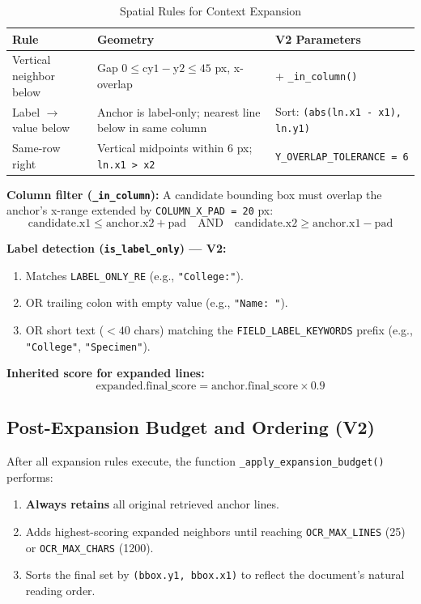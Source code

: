 \documentclass[11pt,a4paper]{article}
\begin{document}
\begin{table}[H]
\centering
\caption{Spatial Rules for Context Expansion}
\label{tab:spatial_rules_table}
\begin{tabular}{|p{4.5cm}|p{5.5cm}|p{5cm}|}
\hline
\textbf{Rule} & \textbf{Geometry} & \textbf{V2 Parameters} \\ \hline
Vertical neighbor below & Gap $0 \le \text{cy1} - \text{y2} \le 45$ px, x-overlap & + \texttt{\_in\_column()} \\ \hline
Label $\rightarrow$ value below & Anchor is label-only; nearest line below in same column & Sort: \texttt{(abs(ln.x1 - x1), ln.y1)} \\ \hline
Same-row right & Vertical midpoints within 6 px; \texttt{ln.x1 > x2} & \texttt{Y\_OVERLAP\_TOLERANCE = 6} \\ \hline
\end{tabular}
\end{table}

\noindent\textbf{Column filter (\texttt{\_in\_column}):} A candidate bounding box must overlap the anchor's x-range extended by \texttt{COLUMN\_X\_PAD = 20} px:
\begin{equation}
\text{candidate.x1} \le \text{anchor.x2} + \text{pad} \quad \text{AND} \quad \text{candidate.x2} \ge \text{anchor.x1} - \text{pad}
\end{equation}

\noindent\textbf{Label detection (\texttt{is\_label\_only}) --- V2:}
\begin{enumerate}
    \item Matches \texttt{LABEL\_ONLY\_RE} (e.g., \texttt{"College:"}).
    \item OR trailing colon with empty value (e.g., \texttt{"Name: "}).
    \item OR short text ($< 40$ chars) matching the \texttt{FIELD\_LABEL\_KEYWORDS} prefix (e.g., \texttt{"College"}, \texttt{"Specimen"}).
\end{enumerate}

\noindent\textbf{Inherited score for expanded lines:}
\begin{equation}
\text{expanded.final\_score} = \text{anchor.final\_score} \times 0.9
\end{equation}

\subsection{Post-Expansion Budget and Ordering (V2)}
After all expansion rules execute, the function \texttt{\_apply\_expansion\_budget()} performs:
\begin{enumerate}
    \item \textbf{Always retains} all original retrieved anchor lines.
    \item Adds highest-scoring expanded neighbors until reaching \texttt{OCR\_MAX\_LINES} (25) or \texttt{OCR\_MAX\_CHARS} (1200).
    \item Sorts the final set by \texttt{(bbox.y1, bbox.x1)} to reflect the document's natural reading order.
\end{enumerate}
\end{document}
